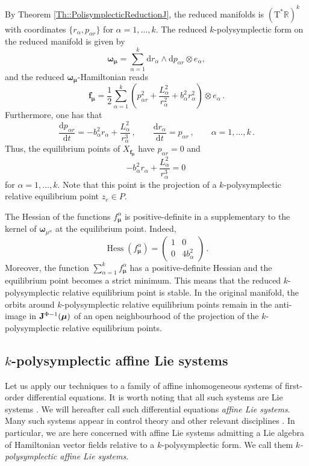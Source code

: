 \documentclass[11pt]{article}
\theoremstyle{plain}
\theoremstyle{definition}
\newcommand{\cT}{\mathrm{T}^\ast}
\newcommand{\bomega}{{\boldsymbol{\omega}}}
\renewcommand{\d}{\mathrm{d}}
\DeclareMathOperator{\Hess}{Hess}
\def\d{\mathrm{d}}
\numberwithin{equation}{section}
\begin{document}

By Theorem \ref{Th::PolisymplecticReductionJ}, the reduced manifolds is $(\cT \mathbb{R})^k$ with coordinates $\{r_\alpha,p_{\alpha r}\}$ for $\alpha=1,\ldots,k$. The reduced $k$-polysymplectic form on the reduced manifold is given by
\[
\boldsymbol{\omega}_{\bm \mu}=\sum^k_{\alpha=1}\d r_{\alpha}\wedge \d p_{\alpha r}\otimes e_\alpha,
\]
and the reduced $\bomega_{\bm\mu}$-Hamiltonian reads
$$
    {\bm f}_{\bm \mu} =\frac 12\sum_{\alpha=1}^k\left(p_{\alpha r}^2 + \frac{L_\alpha^2}{r^2_\alpha} + b_\alpha^2 r_\alpha^2 \right)\otimes e_\alpha\,.
$$
Furthermore, one has that
\[
\frac{\d p_{\alpha r}}{\d t}=-b_\alpha ^2r_\alpha +\frac{L_\alpha^2}{r^3_\alpha}\,,\qquad \frac{\d r_\alpha }{\d t}=p_{\alpha r}\,,\qquad \alpha=1,\dotsc,k\,.
\]
Thus, the equilibrium points of $X_{{\bm f}_{\bm\mu}}$ have $p_{\alpha r}=0$ and 
$$
    -b^2_\alpha r_\alpha+\frac{L_\alpha^2}{r^3_\alpha}=0\,
$$
for $\alpha=1,\ldots,k$. Note that this point is the projection of a $k$-polysymplectic relative equilibrium point $z_e\in P$.


The Hessian of the functions $f_{\bm \mu}^\alpha$ is positive-definite in a supplementary to the kernel of ${\bm \omega}_{\mu^\alpha}$ at the equilibrium point. Indeed, 
$$
\Hess( f_{\bm \mu}^\alpha) = \begin{pmatrix} 1&0 \\ 0&4b_\alpha^2 \end{pmatrix}\,.
$$
Moreover, the function $\sum_{\alpha=1}^kf^\alpha_{\bm \mu}$ has a positive-definite Hessian and the equilibrium point becomes a strict minimum. This means that the reduced $k$-polysymplectic relative equilibrium point is stable. In the original manifold, the orbits around $k$-polysymplectic relative equilibrium points remain in the anti-image in ${\bf J}^{\Phi-1}(\bm\mu)$ of an open neighbourhood of the projection of the $k$-polysymplectic relative equilibrium points.





\subsection{\texorpdfstring{$k$}{}-polysymplectic affine Lie systems}
Let us apply our techniques to a family of affine inhomogeneous systems of first-order differential equations. It is worth noting that all such systems are Lie systems \cite{CL_11}. We will hereafter call such differential equations {\it affine Lie systems}. Many such systems appear in control theory and other relevant disciplines \cite{CR_03}. In particular, we are here concerned with affine Lie systems admitting a Lie algebra of Hamiltonian vector fields relative to a $k$-polysymplectic form. We call them {\it $k$-polysymplectic affine Lie systems}. 
\end{document}
